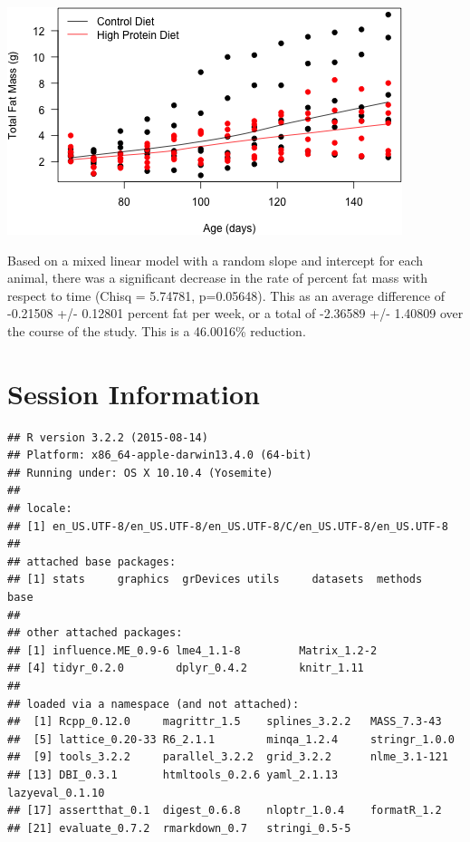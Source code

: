 \documentclass[]{article}
\begin{document}
\includegraphics{figures/total-fat-mass-scatterplot-hpd-1.png}

Based on a mixed linear model with a random slope and intercept for each
animal, there was a significant decrease in the rate of percent fat mass
with respect to time (Chisq = 5.74781, p=0.05648). This as an average
difference of -0.21508 +/- 0.12801 percent fat per week, or a total of
-2.36589 +/- 1.40809 over the course of the study. This is a 46.0016\%
reduction.

\section{Session Information}\label{session-information}

\begin{verbatim}
## R version 3.2.2 (2015-08-14)
## Platform: x86_64-apple-darwin13.4.0 (64-bit)
## Running under: OS X 10.10.4 (Yosemite)
## 
## locale:
## [1] en_US.UTF-8/en_US.UTF-8/en_US.UTF-8/C/en_US.UTF-8/en_US.UTF-8
## 
## attached base packages:
## [1] stats     graphics  grDevices utils     datasets  methods   base     
## 
## other attached packages:
## [1] influence.ME_0.9-6 lme4_1.1-8         Matrix_1.2-2      
## [4] tidyr_0.2.0        dplyr_0.4.2        knitr_1.11        
## 
## loaded via a namespace (and not attached):
##  [1] Rcpp_0.12.0     magrittr_1.5    splines_3.2.2   MASS_7.3-43    
##  [5] lattice_0.20-33 R6_2.1.1        minqa_1.2.4     stringr_1.0.0  
##  [9] tools_3.2.2     parallel_3.2.2  grid_3.2.2      nlme_3.1-121   
## [13] DBI_0.3.1       htmltools_0.2.6 yaml_2.1.13     lazyeval_0.1.10
## [17] assertthat_0.1  digest_0.6.8    nloptr_1.0.4    formatR_1.2    
## [21] evaluate_0.7.2  rmarkdown_0.7   stringi_0.5-5
\end{verbatim}
\end{document}
